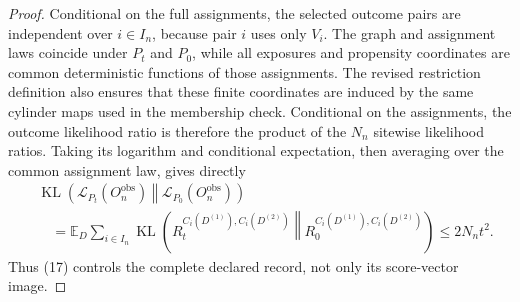\documentclass{article}
\begin{document}
\begin{proof}
Conditional on the full assignments, the selected outcome pairs are independent over \(i\in I_n\), because pair \(i\) uses only \(V_i\).  The graph and assignment laws coincide under \(P_t\) and \(P_0\), while all exposures and propensity coordinates are common deterministic functions of those assignments.  The revised restriction definition also ensures that these finite coordinates are induced by the same cylinder maps used in the membership check.  Conditional on the assignments, the outcome likelihood ratio is therefore the product of the \(N_n\) sitewise likelihood ratios.  Taking its logarithm and conditional expectation, then averaging over the common assignment law, gives directly
\[
 \begin{aligned}
 &\operatorname{KL}\!\left(
   \mathcal L_{P_t}(O_n^{\mathrm{obs}})
   \middle\Vert
   \mathcal L_{P_0}(O_n^{\mathrm{obs}})
  \right)\\
 &\quad=
 \mathbb E_D\sum_{i\in I_n}
 \operatorname{KL}\!\left(
  R_t^{C_i(D^{(1)}),C_i(D^{(2)})}
  \middle\Vert
  R_0^{C_i(D^{(1)}),C_i(D^{(2)})}
 \right)
 \le2N_nt^2.
 \end{aligned} \tag{17}
\]
Thus (17) controls the complete declared record, not only its score-vector image.


\end{proof}
\end{document}
